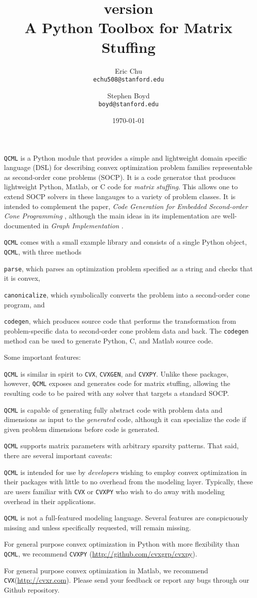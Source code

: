 \documentclass[11pt]{article}
\title{\qcml version \qcmlver \\
A Python Toolbox for Matrix Stuffing}
\author{
Eric Chu\\\texttt{echu508@stanford.edu}
\and
Stephen Boyd\\\texttt{boyd@stanford.edu}
}
\date{\today}
\def\qcml{\texttt{QCML}\xspace}
\def\cvxpy{\texttt{CVXPY}\xspace}
\def\cvx{\texttt{CVX}\xspace}
\def\cvxgen{\texttt{CVXGEN}\xspace}
\begin{document}
  \maketitle
  
\qcml is a Python module that provides a simple and lightweight domain
specific language (DSL) for describing convex optimization problem families
representable as second-order cone problems (SOCP). It is a code generator
that produces lightweight Python, Matlab, or C code for \emph{matrix
stuffing}. This allows one to extend SOCP solvers in these langauges to a 
variety of problem classes. It is intended to complement the paper, 
\emph{Code Generation for Embedded Second-order Cone Programming} \cite{ECC}, 
although the main ideas in its
implementation are well-documented in \emph{Graph Implementation}
\cite{Grant}.

\qcml comes with a small example library and consists of a single Python
object, \texttt{QCML}, with three methods
\BIT
\item \texttt{parse}, which parses an optimization problem specified as a
string and checks that it is convex,
\item \texttt{canonicalize}, which symbolically converts the problem into
a second-order cone program, and
\item \texttt{codegen}, which produces source code that performs the
transformation from problem-specific data to second-order cone problem data
and back.
\EIT
The \texttt{codegen} method can be used to generate Python, C, and Matlab
source code.

Some important features:
\BIT
\item \qcml is similar in spirit to \cvx, \cvxgen, and 
\cvxpy. Unlike these packages, however, \qcml exposes and generates code
for matrix stuffing, allowing the resulting code to be paired with any solver
that targets a standard SOCP.
\item \qcml is capable of generating fully abstract code with problem data and
dimensions as input to the \emph{generated} code, although it can specialize
the code if given problem dimensions before code is generated.
\item \qcml supports matrix parameters with arbitrary sparsity patterns.
\EIT
That said, there are several important caveats:
\BIT
\item \qcml is intended for use by \emph{developers} wishing to employ convex
optimization in their packages with little to no overhead from the modeling 
layer. Typically, these are users familiar with \cvx or \cvxpy who wish to
do away with modeling overhead in their applications.
\item \qcml is not a full-featured modeling language. Several features are
conspicuously missing and unless specifically requested, will remain missing.
\item For general purpose convex optimization in Python with more flexibility
than \qcml, we recommend \cvxpy 
(\url{http://github.com/cvxgrp/cvxpy}).
\item For general purpose convex optimization in Matlab, we recommend 
\cvx (\url{http://cvxr.com}).
\EIT
Please send your feedback or report any bugs through our Github repository.
\end{document}
